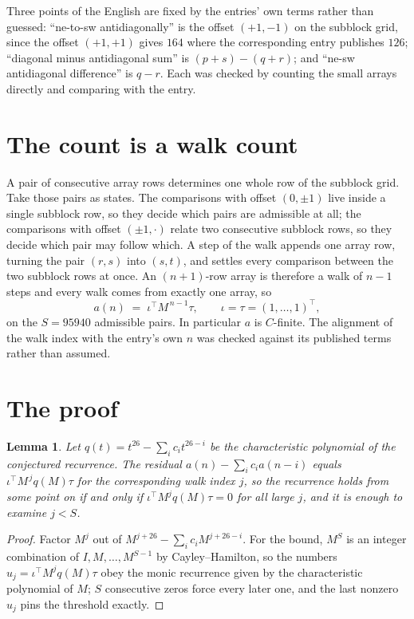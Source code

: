 \documentclass[11pt,a4paper]{article}
\theoremstyle{plain}
\newtheorem{lemma}[theorem]{Lemma}
\theoremstyle{definition}
\begin{document}
Three points of the English are fixed by the entries' own terms rather than guessed:
``ne-to-sw antidiagonally'' is the offset $(+1,-1)$ on the subblock grid, since the offset
$(+1,+1)$ gives $164$ where the corresponding entry publishes $126$; ``diagonal minus
antidiagonal sum'' is $(p+s)-(q+r)$; and ``ne-sw antidiagonal difference'' is $q-r$. Each was
checked by counting the small arrays directly and comparing with the entry.

\section{The count is a walk count}

A pair of consecutive array rows determines one whole row of the subblock grid. Take those
pairs as states. The comparisons with offset $(0,\pm1)$ live inside a single subblock row, so
they decide which pairs are admissible at all; the comparisons with offset $(\pm1,\cdot)$
relate two consecutive subblock rows, so they decide which pair may follow which. A step of the
walk appends one array row, turning the pair $(r,s)$ into $(s,t)$, and settles every comparison
between the two subblock rows at once. An $(n+1)$-row array is therefore a walk of $n-1$ steps
and every walk comes from exactly one array, so
\[
a(n)\;=\;\iota^{\!\top}M^{\,n-1}\tau,\qquad \iota=\tau=(1,\dots,1)^{\!\top},
\]
on the $S=95940$ admissible pairs. In particular $a$ is $C$-finite. The alignment of the walk
index with the entry's own $n$ was checked against its published terms rather than assumed.

\section{The proof}

\begin{lemma}\label{lem:crit}
Let $q(t)=t^{26}-\sum_i c_it^{26-i}$ be the characteristic polynomial of the
conjectured recurrence. The residual $a(n)-\sum_ic_ia(n-i)$ equals
$\iota^{\!\top}M^{\,j}q(M)\tau$ for the corresponding walk index $j$, so the recurrence
holds from some point on if and only if $\iota^{\!\top}M^{j}q(M)\tau=0$ for all large $j$,
and it is enough to examine $j<S$.
\end{lemma}

\begin{proof}
Factor $M^{j}$ out of $M^{j+26}-\sum_ic_iM^{j+26-i}$. For the bound, $M^{S}$
is an integer combination of $I,M,\dots,M^{S-1}$ by Cayley--Hamilton, so the numbers
$u_j=\iota^{\!\top}M^{j}q(M)\tau$ obey the monic recurrence given by the characteristic
polynomial of $M$; $S$ consecutive zeros force every later one, and the last nonzero $u_j$
pins the threshold exactly.
\end{proof}
\end{document}
